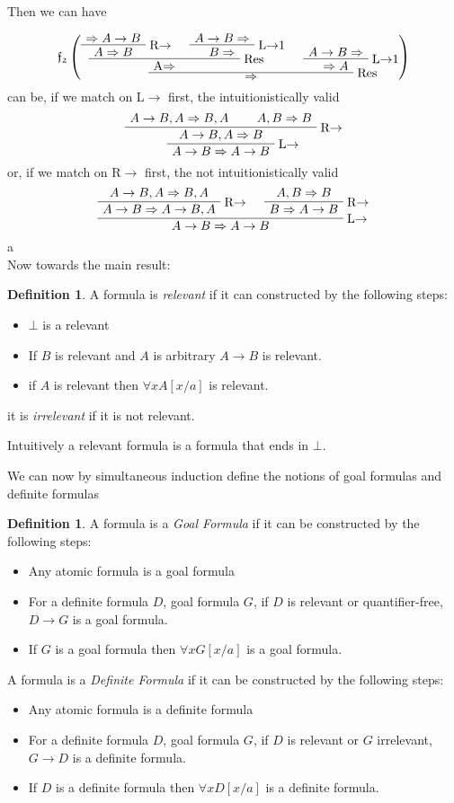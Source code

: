 \documentclass[onehalfspacing]{article}
\theoremstyle{definition}
\theoremstyle{definition}
\theoremstyle{definition}
\theoremstyle{definition}
\theoremstyle{definition}
\newtheorem{definition}[theorem]{Definition}
\theoremstyle{definition}
\begin{document}
Then we can have

$$\mathfrak{f_2}\left(\AxiomC{$\Rightarrow A\to B$}
\RightLabel{R$\to$}
\UnaryInfC{$A\Rightarrow B$}
\AxiomC{$A\to B\Rightarrow$}
\RightLabel{L$\to$1}
\UnaryInfC{$B\Rightarrow$}
\RightLabel{Res}
\BinaryInfC{A$\Rightarrow$}
\AxiomC{$A\to B\Rightarrow$}
\RightLabel{L$\to$1}
\UnaryInfC{$\Rightarrow A$}
\RightLabel{Res}
\BinaryInfC{$\Rightarrow$}
\DisplayProof\right)$$ can be, if we match on L$\to$ first, the intuitionistically valid $$\AxiomC{$A\to B, A\Rightarrow B, A$}\AxiomC{$A, B\Rightarrow B$}\RightLabel{R$\to$}\BinaryInfC{$A\to B, A\Rightarrow B$}\RightLabel{L$\to$}\UnaryInfC{$A\to B\Rightarrow A\to B$}\DisplayProof$$
or, if we match on R$\to$ first, the not intuitionistically valid $$\AxiomC{$A\to B, A\Rightarrow B, A$}\RightLabel{R$\to$}\UnaryInfC{$A\to B\Rightarrow A\to B, A$}\AxiomC{$A, B\Rightarrow B$}\RightLabel{R$\to$}\UnaryInfC{$B\Rightarrow A\to B$}\RightLabel{L$\to$}\BinaryInfC{$A\to B\Rightarrow A\to B$}\DisplayProof$$
a
\\

Now towards the main result:
\begin{definition}
	A formula is \textit{relevant} if it can constructed by the following steps:
	\begin{itemize}
		\item $\bot$ is a relevant
		\item If $B$ is relevant and $A$ is arbitrary $A\to B$ is relevant.
		\item if $A$ is relevant then $\forall x A[x/a]$ is relevant.
	\end{itemize}
	it is \textit{irrelevant} if it is not relevant.
\end{definition}

Intuitively a relevant formula is a formula that ends in $\bot$.

We can now by simultaneous induction define the notions of goal formulas and definite formulas

\begin{definition}
	A formula is a \textit{Goal Formula} if it can be constructed by the following steps:
	\begin{itemize}
		\item Any atomic formula is a goal formula
		\item For a definite formula $D$, goal formula $G$, if $D$ is relevant or quantifier-free, $D\to G$ is a goal formula.
		\item If $G$ is a goal formula then $\forall xG[x/a]$ is a goal formula.
	\end{itemize}
	A formula is a \textit{Definite Formula} if it can be constructed by the following steps:
	\begin{itemize}
		\item Any atomic formula is a definite formula
		\item For a definite formula $D$, goal formula $G$, if $D$ is relevant or $G$ irrelevant, $G\to D$ is a definite formula.
		\item If $D$ is a definite formula then $\forall xD[x/a]$ is a definite formula.
	\end{itemize}
\end{definition}
\end{document}

